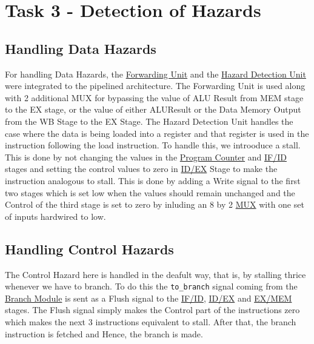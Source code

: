 \documentclass[12pt]{article}
\begin{document}
\section*{\Huge Task 3 - Detection of Hazards}
\subsection*{\Large Handling Data Hazards}
For handling Data Hazards, the \hyperref[forward]{Forwarding Unit} and the \hyperref[hdu]{Hazard Detection Unit} were integrated to the pipelined architecture. The Forwarding Unit is used along with 2 additional MUX for bypassing the value of ALU Result from MEM stage to the EX stage, or the value of either ALUResult or the Data Memory Output from the WB Stage to the EX Stage. The Hazard Detection Unit handles the case where the data is being loaded into a register and that register is used in the instruction following the load instruction. To handle this, we introoduce a stall. This is done by not changing the values in the \hyperref[pc]{Program Counter} and \hyperref[if_id]{IF/ID} stages and setting the control values to zero in \hyperref[id_ex]{ID/EX} Stage to make the instruction analogous to stall. This is done by adding a Write signal to the first two stages which is set low when the values should remain unchanged and the Control of the third stage is set to zero by inluding an 8 by 2 \hyperref[muxc]{MUX} with one set of inputs hardwired to low.
\subsection*{\Large Handling Control Hazards}
The Control Hazard here is handled in the deafult way, that is, by stalling thrice whenever we have to branch. To do this the \texttt{to\_branch} signal coming from the \hyperref[branch_module]{Branch Module} is sent as a Flush signal to the \hyperref[if_id]{IF/ID}, \hyperref[id_ex]{ID/EX} and \hyperref[ex_mem]{EX/MEM} stages. The Flush signal simply makes the Control part of the instructions zero which makes the next 3 instructions equivalent to stall. After that, the branch instruction is fetched and Hence, the branch is made.
\end{document}
